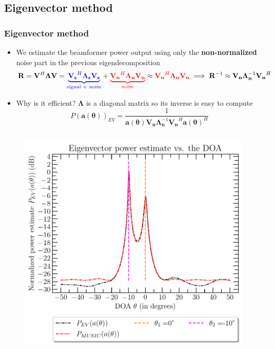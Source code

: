 \documentclass[UKenglish,8pt,aspectratio=1610]{beamer}
\begin{document}
	\subsection{Eigenvector method}
	\begin{frame}
	\frametitle{Eigenvector method \cite{twoDecades,uncini,Johnson1993ArraySP}}
	\begin{itemize}
		\item We estimate the beamformer power output using only the \textbf{non-normalized} noise part in the previous eigendecomposition
		\begin{equation}
			\mathbf{R}=\mathbf{V}^H\boldsymbol{\Lambda}\mathbf{V} = \textcolor{blue}{\underbrace{\mathbf{V_s}^H\boldsymbol{\Lambda}_{\mathbf{s}}\mathbf{V_s}}_{\text{signal + noise}} }+ \textcolor{red}{\underbrace{\mathbf{V_n}^H\boldsymbol{\Lambda}_{\mathbf{n}}\mathbf{V_n}}_{\text{noise}}}\approx \textcolor{red}{\mathbf{V_n}^H\boldsymbol{\Lambda}_{\mathbf{n}}\mathbf{V_n}}\implies \mathbf{R}^{-1}\approx \mathbf{V_n}\boldsymbol{\Lambda}_{\mathbf{n}}^{-1}\mathbf{V_n}^H
		\end{equation}
		\item Why is it efficient? $\boldsymbol{\Lambda}$ is a diagonal matrix so its inverse is easy to compute
		\begin{equation}
			P(\mathbf{a(\theta)})_{EV}=\dfrac{1}{\mathbf{a(\theta)}\mathbf{V_n}\boldsymbol{\Lambda}_{\mathbf{n}}^{-1}\mathbf{V_n}^H\mathbf{a(\theta)}^H}
		\end{equation}
	\end{itemize}
	\begin{columns}
		\begin{column}{0.5\textwidth}
			\begin{figure}[h!]
				\vspace{-15pt}
				\centering
				\includegraphics[scale=0.4]{question6/part_A_question_6_eigenvector_spectrum_estimate.pdf}

\end{figure}
\end{column}
\end{columns}
\end{frame}
\end{document}
